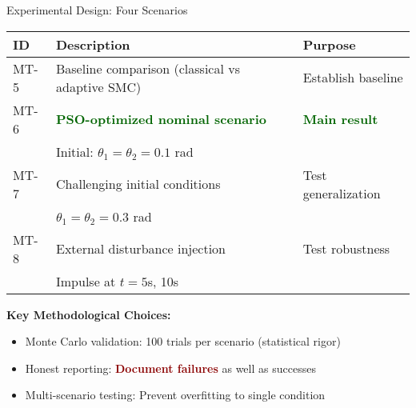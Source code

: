 \documentclass[10pt,aspectratio=169]{beamer}
\newcommand{\emphred}[1]{\textcolor{darkred}{\textbf{#1}}}
\newcommand{\emphgreen}[1]{\textcolor{darkgreen}{\textbf{#1}}}
\begin{document}
\begin{frame}{Experimental Design: Four Scenarios}
\begin{table}
\centering
\small
\begin{tabular}{lp{5cm}l}
\toprule
\textbf{ID} & \textbf{Description} & \textbf{Purpose} \\
\midrule
MT-5 & Baseline comparison (classical vs adaptive SMC) & Establish baseline \\
MT-6 & \emphgreen{PSO-optimized nominal scenario} & \emphgreen{Main result} \\
       & Initial: $\theta_1 = \theta_2 = 0.1$ rad & \\
MT-7 & Challenging initial conditions & Test generalization \\
       & $\theta_1 = \theta_2 = 0.3$ rad & \\
MT-8 & External disturbance injection & Test robustness \\
       & Impulse at $t=5$s, 10s & \\
\bottomrule
\end{tabular}
\end{table}

\vspace{0.3cm}
\textbf{Key Methodological Choices:}
\begin{itemize}
    \item Monte Carlo validation: 100 trials per scenario (statistical rigor)
    \item Honest reporting: \emphred{Document failures} as well as successes
    \item Multi-scenario testing: Prevent overfitting to single condition
\end{itemize}
\end{frame}
\end{document}
